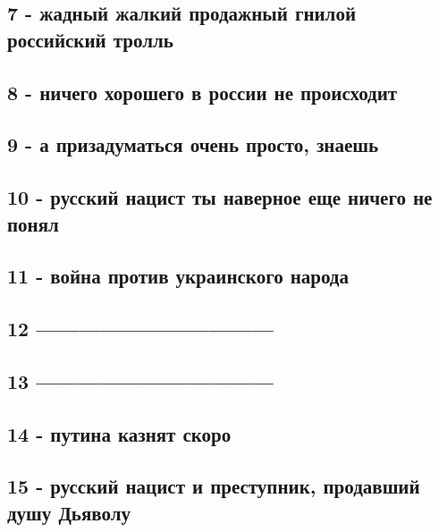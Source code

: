 \subsection{7 - жадный жалкий продажный гнилой российский тролль}

\subsection{8 - ничего хорошего в россии не происходит}

\subsection{9 - а призадуматься очень просто, знаешь}

\subsection{10 - русский нацист ты наверное еще ничего не понял}

\subsection{11 - война против украинского народа}

\subsection{12 ---------------------------------}

\subsection{13 ---------------------------------}

\subsection{14 - путина казнят скоро}

\subsection{15 - русский нацист и преступник, продавший душу Дьяволу}

